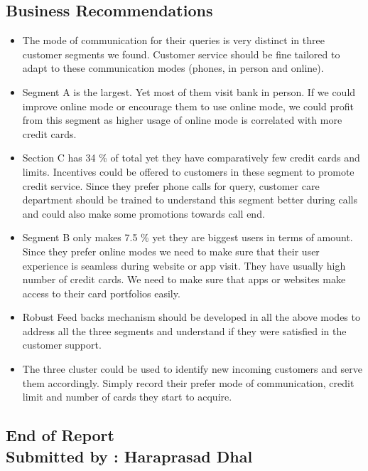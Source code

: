 \documentclass[10pt,a4paper]{style}
\begin{document}
	\subsection{Business Recommendations}
	\begin{itemize}
		\item  The mode of communication for their queries is very distinct in three customer segments we found. Customer service should be fine tailored to adapt to these communication modes (phones, in person and online).
		\item Segment A is the largest. Yet most of them visit bank in person. If we could improve online mode or encourage them to use online mode, we could profit from this segment as higher usage of online mode is correlated with more credit cards.
		\item Section C has 34 \% of total yet they have comparatively few credit cards and limits. Incentives could be offered to customers in these segment to promote credit service. Since they prefer phone calls for query, customer care department should be trained to understand this segment better during calls and could also make some promotions towards call end. 
		\item Segment B only makes 7.5 \% yet they are biggest users in terms of amount. Since they prefer online modes we need to make sure that their user experience is seamless during website or app visit. They have usually high number of credit cards. We need to make sure that apps or websites make access to their card portfolios easily. 
		\item Robust Feed backs mechanism should be developed in all the above modes to address all the three segments and understand if they were satisfied in the customer support.   
		\item The three cluster could be used to identify new incoming customers and serve them accordingly. Simply record their prefer mode of communication, credit limit and number of cards they start to acquire. 
	\end{itemize}
	
\begin{centering}
	\vspace{20pt}
	\subsection*{End of Report\\Submitted by : Haraprasad Dhal}
\end{centering}
\end{document}
